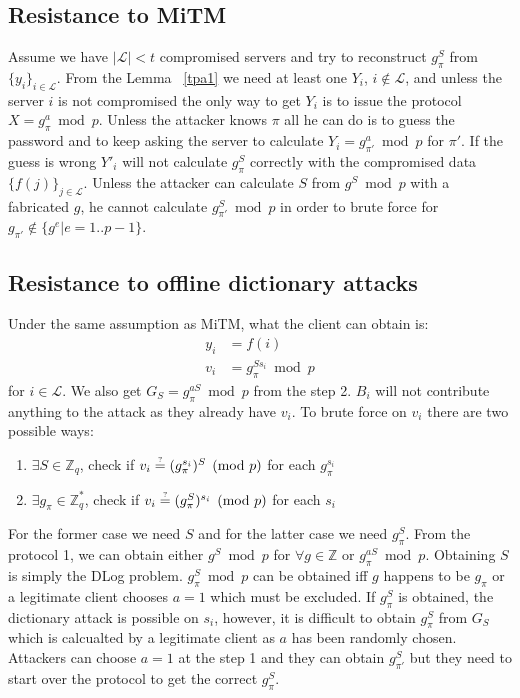 \subsection{Resistance to MiTM}
Assume we have $|\mathcal{L}| < t$ compromised servers and try to
reconstruct $g_{\pi}^S$ from $\{y_i\}_{i \in \mathcal{L}}$.
From the Lemma ~\ref{tpa1} we need at least one $Y_i$, $i \notin
\mathcal{L}$, and unless the server $i$ is not compromised the only
way to get $Y_i$ is to issue the protocol $X = g_{\pi}^a \bmod
p$. Unless the attacker knows $\pi$ all he can do is to guess the
password and to keep asking the server to calculate $Y_i = g_{\pi'}^a
\bmod p$ for $\pi'$. If the guess is wrong $Y'_i$ will not calculate
$g_{\pi}^S$ correctly with the compromised data $\{f(j)\}_{j \in
\mathcal{L}}$.
Unless the attacker can calculate $S$ from $g^S \bmod p$ with a
fabricated $g$, he cannot calculate $g_{\pi'}^S \bmod p$ in
order to brute force for $g_{\pi'} \notin \{g^e | e = 1..p-1\}$.

\subsection{Resistance to offline dictionary attacks}
Under the same assumption as MiTM, what the client can obtain is:
\begin{align*}
  y_i &= f(i) \\
  v_i &= g_{\pi}^{Ss_i} \bmod p
\end{align*}
for $i \in \mathcal{L}$. We also get $G_S = g_{\pi}^{aS} \bmod p$ from
the step 2. $B_i$ will not contribute anything to the attack as they already
have $v_i$.
To brute force on $v_i$ there are two possible ways:
\begin{enumerate}
\item $\exists S \in \mathbb{Z}_q$, check if
  $v_i \stackrel{\text{\tiny ?}}{=} (g_{\pi}^{s_i})^S \pmod p$
  for each $g_{\pi}^{s_i}$ \\
\item $\exists g_{\pi} \in \mathbb{Z}^*_q$, check if
  $v_i \stackrel{\text{\tiny ?}}{=} (g_{\pi}^S)^{s_i} \pmod p$
  for each $s_i$
\end{enumerate}
For the former case we need $S$ and for the latter case we need
$g_{\pi}^S$. From the protocol 1, we can obtain either $g^S \bmod p$
for $\forall g \in \mathbb{Z}$ or $g_{\pi}^{aS} \bmod p$. Obtaining
$S$ is simply the {\sf DLog} problem. $g_{\pi}^S \bmod p$ can be
obtained iff $g$ happens to be $g_{\pi}$ or a legitimate client
chooses $a = 1$ which must be excluded.
If $g_{\pi}^S$ is obtained, the dictionary attack is possible on
$s_i$, however, it is difficult to obtain $g_{\pi}^S$ from $G_S$ which
is calcualted by a legitimate client as $a$ has been randomly
chosen. Attackers can choose $a = 1$ at the step 1 and they can obtain
$g_{\pi'}^S$ but they need to start over the protocol to get the
correct $g_{\pi}^S$.
